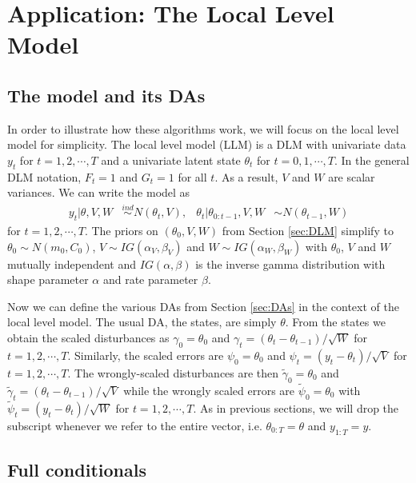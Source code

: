 \documentclass{article}
\begin{document}
\section{Application: The Local Level Model}\label{sec:LLM}

\subsection{The model and its DAs}

In order to illustrate how these algorithms work, we will focus on the local level model for simplicity. The local level model (LLM) is a DLM with univariate data $y_t$ for $t=1,2,\cdots,T$ and a univariate latent state $\theta_t$ for $t=0,1,\cdots,T$. In the general DLM notation, $F_t=1$ and $G_t=1$ for all $t$. As a result, $V$ and $W$ are scalar variances. We can write the model as
\begin{align}
  y_t |\theta,V,W& \stackrel{ind}{\sim} N(\theta_t,V), &
  \theta_t |\theta_{0:t-1},V,W& \sim N(\theta_{t-1},W) 
\end{align}
for $t=1,2,\cdots,T$. The priors on $(\theta_0,V,W)$ from Section \ref{sec:DLM} simplify to $\theta_0\sim N(m_0,C_0)$, $V\sim IG(\alpha_V,\beta_V)$ and $W\sim IG(\alpha_W,\beta_W)$ with $\theta_0$, $V$ and $W$ mutually independent and $IG(\alpha,\beta)$ is the inverse gamma distribution with shape parameter $\alpha$ and rate parameter $\beta$. 

Now we can define the various DAs from Section \ref{sec:DAs} in the context of the local level model. The usual DA, the states, are simply $\theta$. From the states we obtain the scaled disturbances as $\gamma_0=\theta_0$ and $\gamma_t = (\theta_t - \theta_{t-1})/\sqrt{W}$ for $t=1,2,\cdots,T$. Similarly, the scaled errors are $\psi_0=\theta_0$ and $\psi_t = (y_t - \theta_t)/\sqrt{V}$ for $t=1,2,\cdots,T$. The wrongly-scaled disturbances are then $\tilde{\gamma}_{0}=\theta_0$ and $\tilde{\gamma}_t = (\theta_t - \theta_{t-1})/\sqrt{V}$ while the wrongly scaled errors are $\tilde{\psi}_0=\theta_0$ with $\tilde{\psi}_t = (y_t - \theta_t)/\sqrt{W}$ for $t=1,2,\cdots,T$. As in previous sections, we will drop the subscript whenever we refer to the entire vector, i.e. $\theta_{0:T}=\theta$ and $y_{1:T}=y$.

\subsection{Full conditionals}\label{sec:LLM:fullcond}
\end{document}
